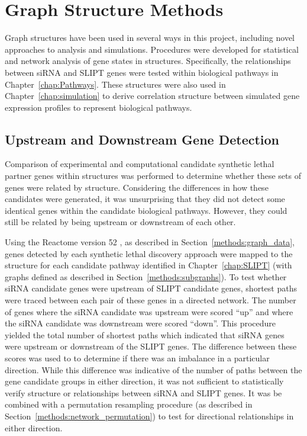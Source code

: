 \FloatBarrier

\section{Graph Structure Methods}
Graph structures have been used in several ways in this project, including novel approaches to analysis and simulations. Procedures were developed for statistical and network analysis of gene states in  structures. Specifically, the relationships between \gls{siRNA} and \gls{SLIPT} genes were tested within biological pathways in Chapter~\ref{chap:Pathways}. These  structures were also used in Chapter~\ref{chap:simulation} to derive correlation structure between simulated \gls{gene expression} profiles to represent biological pathways.


\subsection{Upstream and Downstream Gene Detection} \label{methods:pathway_str} 
Comparison of experimental and computational candidate \gls{synthetic lethal} partner genes within  structures was performed to determine whether these sets of genes were related by  structure. Considering the differences in how these candidates were generated, it was unsurprising that they did not detect some identical genes within the candidate biological pathways. However, they could still be related by being upstream or downstream of each other. 

Using the Reactome version 52 \citep{Reactome}, as described in Section~\ref{methods:graph_data}, genes detected by each \gls{synthetic lethal} discovery approach were mapped to the  structure for each candidate pathway identified in Chapter~\ref{chap:SLIPT} (with graphs defined as described in Section~\ref{methods:subgraphs}). To test whether \gls{siRNA} candidate genes were upstream of \gls{SLIPT} candidate genes, \glspl{shortest path} were traced between each pair of these genes in a directed network. The number of genes where the \gls{siRNA} candidate was upstream were scored ``up'' and where the \gls{siRNA} candidate was downstream were scored ``down''.  This procedure yielded the total number of \glspl{shortest path} which indicated that \gls{siRNA} genes were upstream or downstream of the \gls{SLIPT} genes. The difference between these scores was used to to determine if there was an imbalance in a particular direction. While this difference was indicative of the number of paths between the gene candidate groups in either direction, it was not sufficient to statistically verify structure or relationships between \gls{siRNA} and \gls{SLIPT} genes. It was be combined with a permutation resampling procedure (as described in Section~\ref{methods:network_permutation}) to test for directional relationships in either direction.

